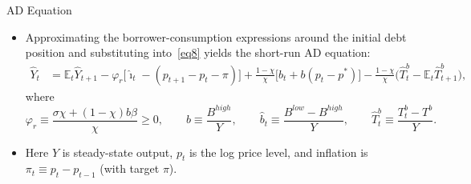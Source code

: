 \documentclass[11pt,aspectratio=169]{beamer}
\newcommand{\E}{\mathbb{E}}
\begin{document}
\begin{frame}{AD Equation}
\small
\begin{itemize}
  \item Approximating the borrower-consumption expressions around the initial debt position
  and substituting into~\eqref{eq8} yields the short-run AD equation:
  \begin{align}
    \hat{Y}_{t}
    &= \E_t\hat{Y}_{t+1}
    -\varphi_{r}\Big[\hat{\imath}_{t}-(p_{t+1}-p_t-\pi)\Big]
    +\frac{1-\chi}{\chi}\Big[\hat{b}_{t}+b(p_t-p^\ast)\Big]
    -\frac{1-\chi}{\chi}\big(\hat{T}_{t}^{b}-\E_t\hat{T}_{t+1}^{b}\big),
    \label{eq9}
  \end{align}
  where
  \[
    \varphi_r \equiv \frac{\sigma\chi+(1-\chi)b\beta}{\chi}\ge 0,
    \qquad
    b \equiv \frac{B^{high}}{Y},
    \qquad
    \hat b_t \equiv \frac{B^{low}-B^{high}}{Y},
    \qquad
    \hat T_t^b \equiv \frac{T_t^b-T^b}{Y}.
  \]
  \item Here $Y$ is steady-state output, $p_t$ is the log price level, and inflation is $\pi_t\equiv p_t-p_{t-1}$ (with target $\pi$).
\end{itemize}
\end{frame}
\end{document}
